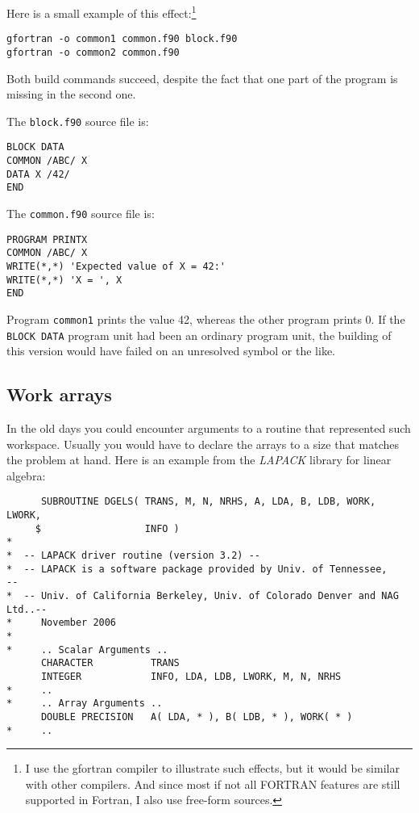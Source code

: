 Here is a small example of this effect:\footnote{I use the gfortran compiler
to illustrate such effects, but it would be similar with other compilers.
And since most if not all FORTRAN features are still supported in Fortran,
I also use free-form sources.}
%
\begin{verbatim}
gfortran -o common1 common.f90 block.f90
gfortran -o common2 common.f90
\end{verbatim}

Both build commands succeed, despite the fact that one part of the program is missing
in the second one.

The \verb+block.f90+ source file is:
%
\begin{verbatim}
BLOCK DATA
COMMON /ABC/ X
DATA X /42/
END
\end{verbatim}

The \verb+common.f90+ source file is:
%
\begin{verbatim}
PROGRAM PRINTX
COMMON /ABC/ X
WRITE(*,*) 'Expected value of X = 42:'
WRITE(*,*) 'X = ', X
END
\end{verbatim}

Program \verb+common1+ prints the value 42, whereas the other
program prints 0. If the \verb+BLOCK DATA+ program unit had been
an ordinary program unit, the building of this version would have failed
on an unresolved symbol or the like.


\subsection{Work arrays}
\label{workarrays}
In the old days you could encounter arguments to a routine that represented
such workspace. Usually you would have to declare the arrays to a size that
matches the problem at hand. Here is an example from the \emph{LAPACK} library
for linear algebra:
%
\begin{verbatim}
      SUBROUTINE DGELS( TRANS, M, N, NRHS, A, LDA, B, LDB, WORK, LWORK,
     $                  INFO )
*
*  -- LAPACK driver routine (version 3.2) --
*  -- LAPACK is a software package provided by Univ. of Tennessee,    --
*  -- Univ. of California Berkeley, Univ. of Colorado Denver and NAG Ltd..--
*     November 2006
*
*     .. Scalar Arguments ..
      CHARACTER          TRANS
      INTEGER            INFO, LDA, LDB, LWORK, M, N, NRHS
*     ..
*     .. Array Arguments ..
      DOUBLE PRECISION   A( LDA, * ), B( LDB, * ), WORK( * )
*     ..
\end{verbatim}

